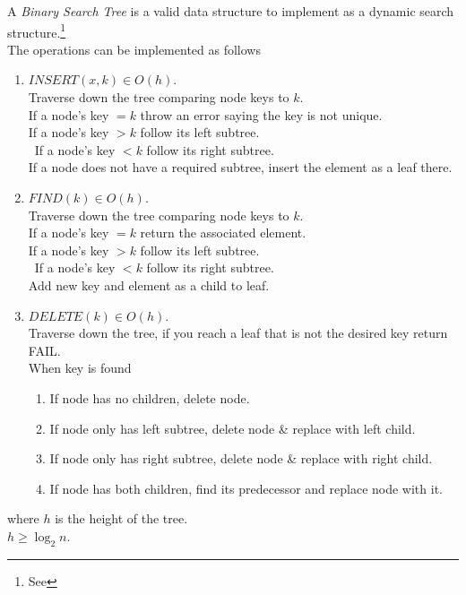 \documentclass[11pt,a4paper]{article}
\begin{document}
\newpage
{}
A \textit{Binary Search Tree} is a valid data structure to implement as a dynamic search structure.\footnote{See {}}\\
The operations can be implemented as follows
\begin{enumerate}[label=\roman*)]
  \item $INSERT(x,k)\in O(h)$.\\
  Traverse down the tree comparing node keys to $k$.\\
  If a node's key $=k$ throw an error saying the key is not unique.\\
  If a node's key $> k$ follow its left subtree.\\\
  If a node's key $<k$ follow its right subtree.\\
  If a node does not have a required subtree, insert the element as a leaf there.
  \item $FIND(k)\in O(h)$.\\
  Traverse down the tree comparing node keys to $k$.\\
  If a node's key $=k$ return the associated element.\\
  If a node's key $>k$ follow its left subtree.\\\
  If a node's key $<k$ follow its right subtree.\\
  Add new key and element as a child to leaf.  
  \item $DELETE(k)\in O(h)$.\\
  Traverse down the tree, if you reach a leaf that is not the desired key return FAIL.\\
  When key is found
  \begin{enumerate}
  	\item If node has no children, delete node.
  	\item If node only has left subtree, delete node \& replace with left child.
  	\item If node only has right subtree, delete node \& replace with right child.
  	\item If node has both children, find its predecessor and replace node with it.
  \end{enumerate}
\end{enumerate}
where $h$ is the height of the tree.\\
\nb $h\geq\log_2n$.\\
\end{document}
